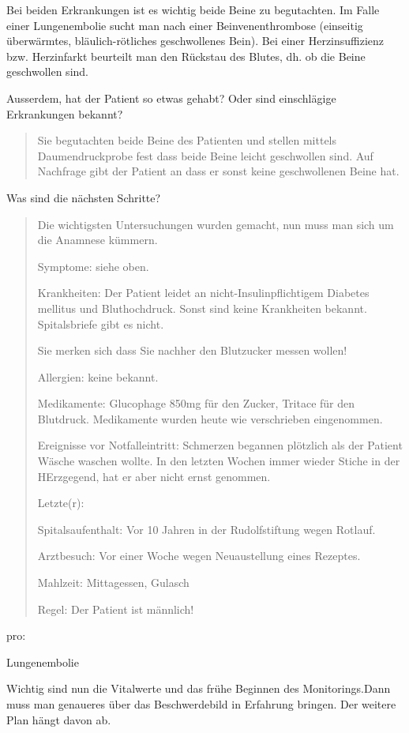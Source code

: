 Bei beiden Erkrankungen ist es wichtig beide Beine zu begutachten. Im
Falle einer Lungenembolie sucht man nach einer Beinvenenthrombose
(einseitig \"uberw\"armtes, bl\"aulich-r\"otliches geschwollenes Bein).
Bei einer Herzinsuffizienz bzw. Herzinfarkt beurteilt man den
R\"uckstau des Blutes, dh. ob die Beine geschwollen sind.

Ausserdem, hat der Patient so etwas gehabt? Oder sind einschl\"agige
Erkrankungen bekannt?  

\begin{quote}
Sie begutachten beide Beine des Patienten und stellen mittels
Daumendruckprobe fest dass beide Beine leicht geschwollen sind. Auf
Nachfrage gibt der Patient an dass er sonst keine geschwollenen Beine
hat. 
\end{quote}

Was sind die n\"achsten Schritte?

\begin{quote}
Die wichtigsten Untersuchungen wurden gemacht, nun muss man sich um die
Anamnese k\"ummern. 

Symptome: siehe oben.

Krankheiten: Der Patient leidet an nicht-Insulinpflichtigem Diabetes
mellitus und Bluthochdruck. Sonst sind keine Krankheiten bekannt.
Spitalsbriefe gibt es nicht. 

Sie merken sich dass Sie nachher den Blutzucker messen wollen!

Allergien: keine bekannt.

Medikamente: Glucophage 850mg f\"ur den Zucker, Tritace f\"ur den
Blutdruck. Medikamente wurden heute wie verschrieben eingenommen. 

Ereignisse vor Notfalleintritt: Schmerzen begannen pl\"otzlich als der
Patient W\"asche waschen wollte. In den letzten Wochen immer wieder
Stiche in der HErzgegend, hat er aber nicht ernst genommen. 

Letzte(r):

Spitalsaufenthalt: Vor 10 Jahren in der Rudolfstiftung wegen Rotlauf.

Arztbesuch: Vor einer Woche wegen Neuaustellung eines Rezeptes.

Mahlzeit: Mittagessen, Gulasch

Regel: Der Patient ist m\"annlich!
\end{quote}
pro:

Lungenembolie 

Wichtig sind nun die Vitalwerte und das fr\"uhe Beginnen des
Monitorings.Dann muss man genaueres \"uber das Beschwerdebild in
Erfahrung bringen. Der weitere Plan h\"angt davon ab.


